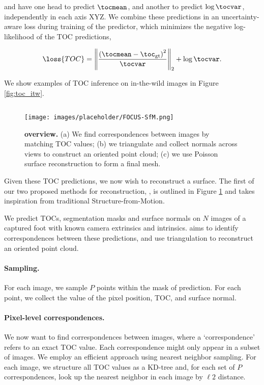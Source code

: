 \noindent and have one head to predict $\tocmean$, and another to predict $\log \tocvar$, independently in each axis XYZ. We combine these predictions in an uncertainty-aware loss during training of the predictor, which minimizes the negative log-likelihood of the TOC predictions,

\begin{equation}
    \loss{TOC} = \left\| \frac{\left( \tocmean - \toc_{\textrm{gt}}\right)^2}{\tocvar} \right\|_2 + \log{\tocvar}.
\end{equation}

We show examples of TOC inference on in-the-wild images in Figure \ref{fig:toc_itw}.


\subsection{\ourSfM}
\label{sec:point_cloud_fusion}

\begin{figure}
    \texttt{[image: images/placeholder/FOCUS-SfM.png]}
    \caption{\textbf{\ourSfM overview.} (a) We find correspondences between images by matching TOC values; (b) we triangulate and collect normals across views to construct an oriented point cloud; (c) we use Poisson surface reconstruction to form a final mesh.}
    \label{fig:focussfm}
\end{figure}

Given these TOC predictions, we now wish to reconstruct a surface. The first of our two proposed methods for reconstruction, \ourSfM, is outlined in Figure \ref{fig:focussfm} and takes inspiration from traditional Structure-from-Motion.

We predict TOCs, segmentation masks and surface normals on $N$ images of a captured foot with known camera extrinsics and intrinsics. \ourSfM aims to identify correspondences between these predictions, and use triangulation to reconstruct an oriented point cloud.

\paragraph{Sampling. } For each image, we sample $P$ points within the mask of prediction. For each point, we collect the value of the pixel position, TOC, and surface normal.

\paragraph{Pixel-level correspondences. } We now want to find correspondences between images, where a `correspondence' refers to an exact TOC value. Each correspondence might only appear in a subset of images. We employ an efficient approach using nearest neighbor sampling. For each image, we structure all TOC values as a KD-tree \cite{bentley1975multidimensional} and, for each set of $P$ correspondences, look up the nearest neighbor in each image by $\ell2$ distance.

